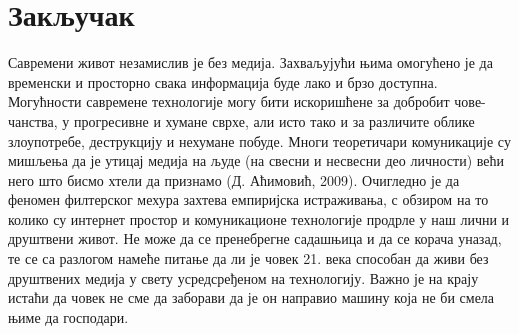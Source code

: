 \documentclass[a4paper]{article}
\begin{document}
\section{Закључак}
\label{sec:zakljucak}

Савремени живот незамислив је без медија. Захваљујући њима омогућено је да временски и просторно свака информација буде лако и брзо доступна. Могућности савремене технологије могу бити искоришћене за добробит чове-чанства, у прогресивне и хумане сврхе, али исто тако и за различите облике злоупотребе, деструкцију и нехумане побуде. Многи теоретичари комуникације су мишљења да је утицај медија на људе (на свесни и несвесни део личности) већи него што бисмо хтели да признамо (Д. Аћимовић, 2009). 
Очигледно је да феномен филтерског мехура захтева емпиријска истраживања, с обзиром на то колико су интернет простор и комуникационе технологије продрле у наш лични и друштвени живот. Не може да се пренебрегне садашњица и да се корача уназад, те се са разлогом намеће питање да ли је човек 21. века способан да живи без друштвених медија у свету усредсређеном на технологију. Важно је на крају истаћи да човек не сме да заборави да је он направио машину која не би смела њиме да господари.


\appendix

\iffalse
 

\fi

\bigskip
\newpage
\end{document}

